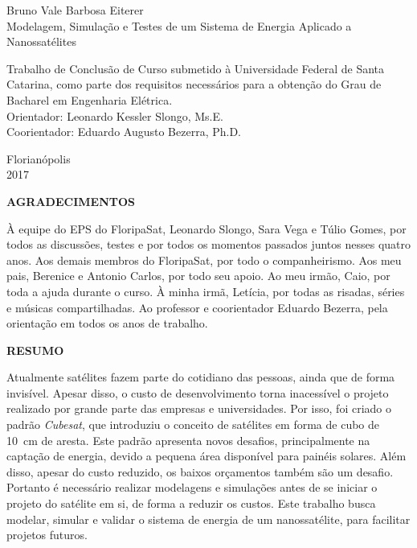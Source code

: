 \documentclass[a5paper, oldfontcommands, hidelinks]{ufsc-thesis}  %
\begin{document}
\pretextual%
\imprimircapa%
\begin{center}
Bruno Vale Barbosa Eiterer \\
\vspace{\fill}
\Large{Modelagem, Simulação e Testes de um Sistema de Energia Aplicado a Nanossatélites} \\
\vspace{\fill}
\end{center}
\hfill
\begin{minipage}{0.5\textwidth}
\raggedright \small Trabalho de Conclusão de Curso submetido à Universidade Federal de Santa Catarina, como parte dos requisitos necessários para a obtenção do Grau de Bacharel em Engenharia Elétrica. \\
Orientador: Leonardo Kessler Slongo, Ms.E. \\
Coorientador: Eduardo Augusto Bezerra, Ph.D.
\end{minipage}
\vfill
\begin{center}
Florianópolis \\
2017
\end{center}


\clearpage

\textual%

\clearpage
\begin{center}
\large\textbf{AGRADECIMENTOS}
\end{center}
À equipe do EPS do FloripaSat, Leonardo Slongo, Sara Vega e Túlio Gomes, por todos as discussões, testes e por todos os momentos passados juntos nesses quatro anos. Aos demais membros do FloripaSat, por todo o companheirismo. Aos meu pais, Berenice e Antonio Carlos, por todo seu apoio. Ao meu irmão, Caio, por toda a ajuda durante o curso. À minha irmã, Letícia, por todas as risadas, séries e músicas compartilhadas. Ao professor e coorientador Eduardo Bezerra, pela orientação em todos os anos de trabalho. 

\clearpage
\begin{center}
\large\textbf{RESUMO}
\end{center}
Atualmente satélites fazem parte do cotidiano das pessoas, ainda que de forma invisível. Apesar disso, o custo de desenvolvimento torna inacessível o projeto realizado por grande parte das empresas e universidades. Por isso, foi criado o padrão \textit{Cubesat}, que introduziu o conceito de satélites em forma de cubo de \SI{10}{\centi\metre} de aresta. Este padrão apresenta novos desafios, principalmente na captação de energia, devido a pequena área disponível para painéis solares. Além disso, apesar do custo reduzido, os baixos orçamentos também são um desafio. Portanto é necessário realizar modelagens e simulações antes de se iniciar o projeto do satélite em si, de forma a reduzir os custos. Este trabalho busca modelar, simular e validar o sistema de energia de um nanossatélite, para facilitar projetos futuros.
\end{document}
